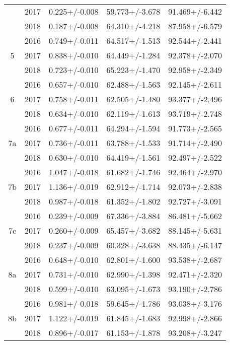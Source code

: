 \begin{table}
\begin{tabular}{ccccc}
   & 2017 &          0.225+/-0.008 &       59.773+/-3.678 &        91.469+/-6.442 \\
   & 2018 &          0.187+/-0.008 &       64.310+/-4.218 &        87.958+/-6.579 \\
\cline{1-5}
\multirow{3}{*}{5} & 2016 &          0.749+/-0.011 &       64.517+/-1.513 &        92.544+/-2.441 \\
   & 2017 &          0.838+/-0.010 &       64.449+/-1.284 &        92.378+/-2.070 \\
   & 2018 &          0.723+/-0.010 &       65.223+/-1.470 &        92.958+/-2.349 \\
\cline{1-5}
\multirow{3}{*}{6} & 2016 &          0.657+/-0.010 &       62.488+/-1.563 &        92.145+/-2.611 \\
   & 2017 &          0.758+/-0.011 &       62.505+/-1.480 &        93.377+/-2.496 \\
   & 2018 &          0.634+/-0.010 &       62.119+/-1.613 &        93.719+/-2.748 \\
\cline{1-5}
\multirow{3}{*}{7a} & 2016 &          0.677+/-0.011 &       64.294+/-1.594 &        91.773+/-2.565 \\
   & 2017 &          0.736+/-0.011 &       63.788+/-1.533 &        91.714+/-2.490 \\
   & 2018 &          0.630+/-0.010 &       64.419+/-1.561 &        92.497+/-2.522 \\
\cline{1-5}
\multirow{3}{*}{7b} & 2016 &          1.047+/-0.018 &       61.682+/-1.746 &        92.464+/-2.970 \\
   & 2017 &          1.136+/-0.019 &       62.912+/-1.714 &        92.073+/-2.838 \\
   & 2018 &          0.987+/-0.018 &       61.352+/-1.802 &        92.727+/-3.091 \\
\cline{1-5}
\multirow{3}{*}{7c} & 2016 &          0.239+/-0.009 &       67.336+/-3.884 &        86.481+/-5.662 \\
   & 2017 &          0.260+/-0.009 &       65.457+/-3.682 &        88.145+/-5.631 \\
   & 2018 &          0.237+/-0.009 &       60.328+/-3.638 &        88.435+/-6.147 \\
\cline{1-5}
\multirow{3}{*}{8a} & 2016 &          0.648+/-0.010 &       62.801+/-1.600 &        93.538+/-2.687 \\
   & 2017 &          0.731+/-0.010 &       62.990+/-1.398 &        92.471+/-2.320 \\
   & 2018 &          0.599+/-0.010 &       63.095+/-1.673 &        93.190+/-2.786 \\
\cline{1-5}
\multirow{3}{*}{8b} & 2016 &          0.981+/-0.018 &       59.645+/-1.786 &        93.038+/-3.176 \\
   & 2017 &          1.122+/-0.019 &       61.845+/-1.683 &        92.998+/-2.866 \\
   & 2018 &          0.896+/-0.017 &       61.153+/-1.878 &        93.208+/-3.247 \\
\bottomrule
\end{tabular}
\end{table}
